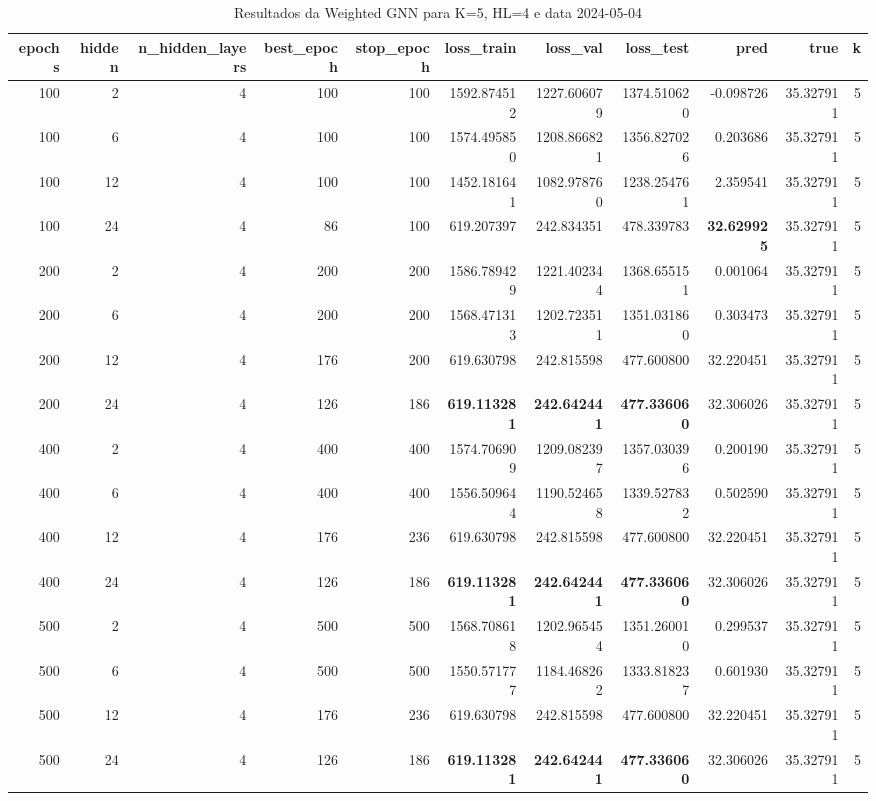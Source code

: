 \begin{table}
\caption{Resultados da Weighted GNN para K=5, HL=4 e data 2024-05-04}
\label{tab:weighted_gnn_results_k5_hl4_d20240504}
\begin{tabular}{rrrrrrrrrrr}
\toprule
epochs & hidden & n\_hidden\_layers & best\_epoch & stop\_epoch & loss\_train & loss\_val & loss\_test & pred & true & k \\
\midrule
100 & 2 & 4 & 100 & 100 & 1592.874512 & 1227.606079 & 1374.510620 & -0.098726 & 35.327911 & 5 \\
100 & 6 & 4 & 100 & 100 & 1574.495850 & 1208.866821 & 1356.827026 & 0.203686 & 35.327911 & 5 \\
100 & 12 & 4 & 100 & 100 & 1452.181641 & 1082.978760 & 1238.254761 & 2.359541 & 35.327911 & 5 \\
100 & 24 & 4 & 86 & 100 & 619.207397 & 242.834351 & 478.339783 & \textbf{32.629925} & 35.327911 & 5 \\
200 & 2 & 4 & 200 & 200 & 1586.789429 & 1221.402344 & 1368.655151 & 0.001064 & 35.327911 & 5 \\
200 & 6 & 4 & 200 & 200 & 1568.471313 & 1202.723511 & 1351.031860 & 0.303473 & 35.327911 & 5 \\
200 & 12 & 4 & 176 & 200 & 619.630798 & 242.815598 & 477.600800 & 32.220451 & 35.327911 & 5 \\
200 & 24 & 4 & 126 & 186 & \textbf{619.113281} & \textbf{242.642441} & \textbf{477.336060} & 32.306026 & 35.327911 & 5 \\
400 & 2 & 4 & 400 & 400 & 1574.706909 & 1209.082397 & 1357.030396 & 0.200190 & 35.327911 & 5 \\
400 & 6 & 4 & 400 & 400 & 1556.509644 & 1190.524658 & 1339.527832 & 0.502590 & 35.327911 & 5 \\
400 & 12 & 4 & 176 & 236 & 619.630798 & 242.815598 & 477.600800 & 32.220451 & 35.327911 & 5 \\
400 & 24 & 4 & 126 & 186 & \textbf{619.113281} & \textbf{242.642441} & \textbf{477.336060} & 32.306026 & 35.327911 & 5 \\
500 & 2 & 4 & 500 & 500 & 1568.708618 & 1202.965454 & 1351.260010 & 0.299537 & 35.327911 & 5 \\
500 & 6 & 4 & 500 & 500 & 1550.571777 & 1184.468262 & 1333.818237 & 0.601930 & 35.327911 & 5 \\
500 & 12 & 4 & 176 & 236 & 619.630798 & 242.815598 & 477.600800 & 32.220451 & 35.327911 & 5 \\
500 & 24 & 4 & 126 & 186 & \textbf{619.113281} & \textbf{242.642441} & \textbf{477.336060} & 32.306026 & 35.327911 & 5 \\

\end{tabular}
\end{table}
